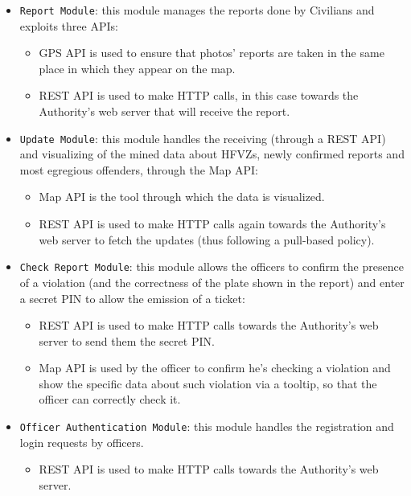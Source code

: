 \documentclass[12pt,a4paper]{article}
\begin{document}
\begin{itemize}
	\item \texttt{Report Module}: this module manages the reports done by Civilians and exploits three APIs:
	\begin{itemize}
		\item GPS API is used to ensure that photos' reports are taken in the same place in which they appear on the map.
		\item REST API is used to make HTTP calls, in this case towards the Authority's web server that will receive the report.
		\end{itemize}
	\item \texttt{Update Module}: this module handles the receiving (through a REST API) and visualizing of the mined data about HFVZs, newly confirmed reports and most egregious offenders, through the Map API:
\begin{itemize}
		\item Map API is the tool through which the data is visualized.
		\item REST API is used to make HTTP calls again towards the Authority's web server to fetch the updates (thus following a pull-based policy).
		\end{itemize}
	\item \texttt{Check Report Module}: this module allows the officers to confirm the presence of a violation (and the correctness of the plate shown in the report) and enter a secret PIN to allow the emission of a ticket:
	\begin{itemize}
		\item REST API is used to make HTTP calls towards the Authority's web server to send them the secret PIN.
		\item Map API is used by the officer to confirm he's checking a violation and show the specific data about such violation via a tooltip, so that the officer can correctly check it.
		\end{itemize}
	\item \texttt{Officer Authentication Module}: this module handles the registration and login requests by officers.
\begin{itemize}
		\item REST API is used to make HTTP calls towards the Authority's web server.
		\end{itemize}
\end{itemize}
\newpage
\end{document}
